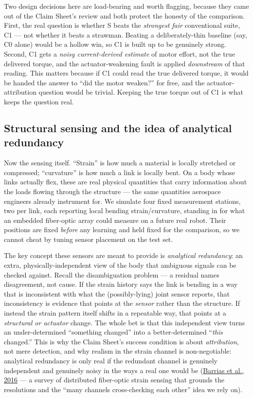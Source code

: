 \documentclass[12pt]{article}
\begin{document}
Two design decisions here are load-bearing and worth flagging, because they came out of the Claim Sheet's review and both protect the honesty of the comparison. First, the real question is whether S beats the \emph{strongest fair} conventional suite, C1 --- not whether it beats a strawman. Beating a deliberately-thin baseline (say, C0 alone) would be a hollow win, so C1 is built up to be genuinely strong. Second, C1 gets a \emph{noisy current-derived estimate} of motor effort, not the true delivered torque, and the actuator-weakening fault is applied \emph{downstream} of that reading. This matters because if C1 could read the true delivered torque, it would be handed the answer to ``did the motor weaken?'' for free, and the actuator-attribution question would be trivial. Keeping the true torque out of C1 is what keeps the question real.

\subsection{Structural sensing and the idea of analytical redundancy}

Now the sensing itself. ``Strain'' is how much a material is locally stretched or compressed; ``curvature'' is how much a link is locally bent. On a body whose links actually flex, these are real physical quantities that carry information about the loads flowing through the structure --- the same quantities aerospace engineers already instrument for. We simulate four fixed measurement stations, two per link, each reporting local bending strain/curvature, standing in for what an embedded fiber-optic array could measure on a future real robot. Their positions are fixed \emph{before} any learning and held fixed for the comparison, so we cannot cheat by tuning sensor placement on the test set.

The key concept these sensors are meant to provide is \emph{analytical redundancy}: an extra, physically-independent view of the body that ambiguous signals can be checked against. Recall the disambiguation problem --- a residual names disagreement, not cause. If the strain history says the link is bending in a way that is inconsistent with what the (possibly-lying) joint sensor reports, that inconsistency is evidence that points at the \emph{sensor} rather than the structure. If instead the strain pattern itself shifts in a repeatable way, that points at a \emph{structural or actuator} change. The whole bet is that this independent view turns an under-determined ``something changed'' into a better-determined ``\emph{this} changed.'' This is why the Claim Sheet's success condition is about \emph{attribution}, not mere detection, and why realism in the strain channel is non-negotiable: analytical redundancy is only real if the redundant channel is genuinely independent and genuinely noisy in the ways a real one would be (\href{https://doi.org/10.3390/s16050748}{Barrias et al., 2016} --- a survey of distributed fiber-optic strain sensing that grounds the resolutions and the ``many channels cross-checking each other'' idea we rely on).
\end{document}
